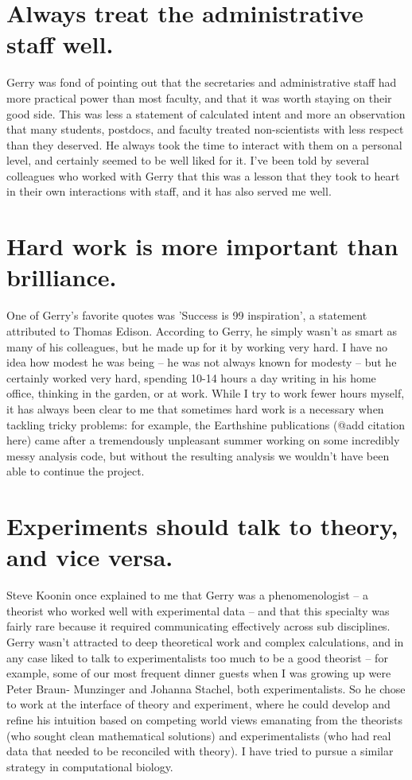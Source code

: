 \section{Always treat the administrative staff well.}

Gerry was fond of pointing out that the secretaries and administrative
staff had more practical power than most faculty, and that it was
worth staying on their good side. This was less a statement of
calculated intent and more an observation that many students,
postdocs, and faculty treated non-scientists with less respect than
they deserved. He always took the time to interact with them on a
personal level, and certainly seemed to be well liked for it. I've
been told by several colleagues who worked with Gerry that this was a
lesson that they took to heart in their own interactions with staff,
and it has also served me well.

\section{Hard work is more important than brilliance.}

One of Gerry's favorite quotes was 'Success is 99%
inspiration', a statement attributed to Thomas Edison. According to
Gerry, he simply wasn't as smart as many of his colleagues, but he
made up for it by working very hard. I have no idea how modest he was
being --  he was not always known for modesty -- but he certainly worked
very hard, spending 10-14 hours a day writing in his home office,
thinking in the garden, or at work. While I try to work fewer hours
myself, it has always been clear to me that sometimes hard work is a
necessary when tackling tricky problems: for example, the Earthshine
publications (@add citation here) came after a tremendously unpleasant
summer working on some incredibly messy analysis code, but without the
resulting analysis we wouldn't have been able to continue the project.

\section{Experiments should talk to theory, and vice versa.}

Steve Koonin once explained to me that Gerry was a phenomenologist -- a
theorist who worked well with experimental data -- and that this
specialty was fairly rare because it required communicating
effectively across sub disciplines. Gerry wasn't attracted to deep
theoretical work and complex calculations, and in any case liked to
talk to experimentalists too much to be a good theorist -- for example,
some of our most frequent dinner guests when I was growing up were
Peter Braun- Munzinger and Johanna Stachel, both experimentalists. So
he chose to work at the interface of theory and experiment, where he
could develop and refine his intuition based on competing world views
emanating from the theorists (who sought clean mathematical solutions)
and experimentalists (who had real data that needed to be reconciled
with theory). I have tried to pursue a similar strategy in
computational biology.

